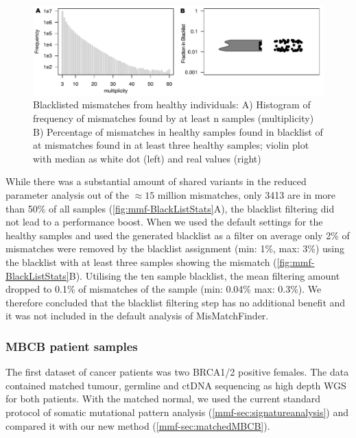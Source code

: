 \begin{figure}[ht]
\centering
\includegraphics[width=.99\linewidth]{Figures/MisMatchFinder/mmfBlackListStats.pdf}
\caption[Blacklisted mismatches from healthy individuals]{Blacklisted mismatches from healthy individuals: A) Histogram of frequency of mismatches found by at least n samples (multiplicity) B) Percentage of mismatches in healthy samples found in blacklist of at mismatches found in at least three healthy samples; violin plot with median as white dot (left) and real values (right)}\label{fig:mmf-BlackListStats}
\end{figure}

While there was a substantial amount of shared variants in the reduced parameter analysis out of the $\approx 15$ million mismatches, only 3413 are in more than 50\% of all samples (\autoref{fig:mmf-BlackListStats}A), the blacklist filtering  did not lead to a performance boost. When we used the default settings for the healthy samples and used the generated blacklist as a filter on average only 2\% of mismatches were removed by the blacklist assignment (min: 1\%, max: 3\%) using the blacklist with at least three samples showing the mismatch (\autoref{fig:mmf-BlackListStats}B). Utilising the ten sample blacklist, the mean filtering amount dropped to 0.1\% of mismatches of the sample (min: 0.04\% max: 0.3\%). We therefore concluded that the blacklist filtering step has no additional benefit and it was not included in the default analysis of MisMatchFinder. 

\subsubsection{MBCB patient samples}
\label{mmf-sec:brcapatients}
The first dataset of cancer patients was two BRCA1/2 positive females. The data contained matched tumour, germline and ctDNA sequencing as high depth WGS for both patients. With the matched normal, we used the current standard protocol of somatic mutational pattern analysis (\autoref{mmf-sec:signatureanalysis}) and compared it with our new method (\autoref{mmf-sec:matchedMBCB}). 

